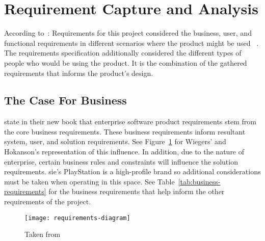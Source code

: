 \thispagestyle{plain}
\newpage
\section{Requirement Capture and Analysis}\label{sec:requirement-capture}

\normalsize

According to~\citet{anton2003successful}: 
Requirements for this project considered the business, user, and functional requirements in different scenarios where the product might be used ~\citep{wiegers2000karl, potts1994inquiry}.
The requirements specification additionally considered the different types of people who would be using the product.
It is the combination of the gathered requirements that informs the product's design.

\subsection{The Case For Business}\label{subsec:the-business-case}

\citet{wiegers_hokanson_2023} state in their new book that enterprise software product requirements stem from the core business requirements.
These business requirements inform resultant system, user, and solution requirements.
See Figure~\ref{fig:requirements-diagram} for Wiegers' and Hokanson's representation of this influence.
In addition, due to the nature of enterprise, certain business rules and constraints will influence the solution requirements.
\gls{sie}'s PlayStation is a high-profile brand so additional considerations must be taken when operating in this space.
See Table~\ref{tab:business-requirements} for the business requirements that help inform the other requirements of the project.

\begin{figure}[!htb]
    \minipage{\textwidth}
    \texttt{[image: requirements-diagram]}
    \caption{Taken from~\citep{wiegers_hokanson_2023}}\label{fig:requirements-diagram}
    \endminipage\hfill
\end{figure}

